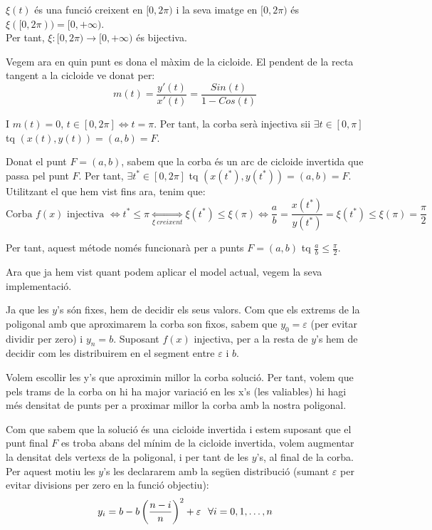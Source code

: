 \documentclass[10pt]{extarticle}
\begin{document}
$\xi(t)$ és una funció creixent en $[0,2\pi)$ i la seva imatge en $[0,2\pi)$ és $\xi([0,2\pi)) = [0,+\infty)$. \\
Per tant, $\xi:[0,2\pi)\rightarrow[0,+\infty)$ és bijectiva. \vspace{.25cm}

Vegem ara en quin punt es dona el màxim de la cicloide. El pendent de la recta tangent a la cicloide ve donat per:
$$m(t) = \frac{y'(t)}{x'(t)} = \frac{Sin(t)}{1-Cos(t)}$$

I $m(t) = 0$, $t \in [0,2\pi] \Longleftrightarrow t = \pi$. Per tant, la corba serà injectiva sii $\exists t \in [0,\pi]$ tq $(x(t), y(t)) = (a,b) = F$. \vspace{.25cm}

Donat el punt $F=(a,b)$, sabem que la corba és un arc de cicloide invertida que passa pel punt $F$. Per tant, $\exists t^* \in [0,2\pi]$ tq $(x(t^*),y(t^*)) = (a,b) = F$. Utilitzant el que hem vist fins ara, tenim que:
$$\text{Corba }f(x)\text{ injectiva }\Longleftrightarrow t^* \le \pi \underset{\xi \ creixent}{\Longleftrightarrow} \xi(t^*) \le \xi(\pi) \Longleftrightarrow \frac{a}{b} = \frac{x(t^*)}{y(t^*)} = \xi(t^*) \le \xi(\pi) = \frac{\pi}{2}$$

Per tant, aquest métode només funcionarà per a punts $F=(a,b)$ tq $\frac{a}{b} \le \frac{\pi}{2}$. \vspace{.75cm}

Ara que ja hem vist quant podem aplicar el model actual, vegem la seva implementació. \vspace{.25cm}

Ja que les $y$'s són fixes, hem de decidir els seus valors. Com que els extrems de la poligonal amb que aproximarem la corba son fixos, sabem que $y_0 = \varepsilon$ (per evitar dividir per zero) i $y_n = b$. Suposant $f(x)$ injectiva, per a la resta de $y$'s hem de decidir com les distribuirem en el segment entre $\varepsilon$ i $b$. \vspace{.25cm}

Volem escollir les y's que aproximin millor la corba solució. Per tant, volem que pels trams de la corba on hi ha major variació en les x's (les valiables) hi hagi més densitat de punts per a proximar millor la corba amb la nostra poligonal. \vspace{.25cm}

Com que sabem que la solució és una cicloide invertida i estem suposant que el punt final $F$ es troba abans del mínim de la cicloide invertida, volem augmentar la densitat dels vertexs de la poligonal, i per tant de les $y$'s, al final de la corba. Per aquest motiu les $y$'s les declararem amb la següen distribució (sumant $\varepsilon$ per evitar divisions per zero en la funció objectiu):
$$y_i = b - b\left(\frac{n-i}{n}\right)^2 + \varepsilon \hspace{.25cm} \forall i = 0,1,\hdots,n$$
\end{document}
